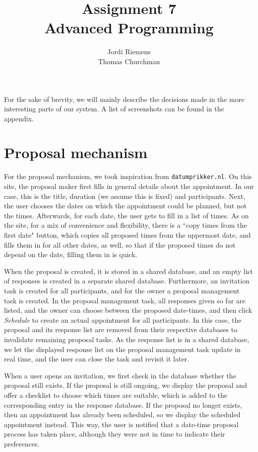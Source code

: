 \documentclass{article}
\title{Assignment 7\\\normalsize{Advanced Programming}}
\author{Jordi Riemens\\Thomas Churchman}
\begin{document}
	\maketitle
	
    For the sake of brevity, we will mainly describe the decisions made in the more interesting parts of our system.
    A list of screenshots can be found in the appendix.
    
	\section{Proposal mechanism}
    For the proposal mechanism, we took inspiration from \texttt{datumprikker.nl}.
    On this site, the proposal maker first fills in general details about the appointment. In our case, this is the title, duration (we assume this is fixed) and participants.
    Next, the user chooses the dates on which the appointment could be planned, but not the times. Afterwards, for each date, the user gets to fill in a list of times.
    As on the site, for a mix of convenience and flexibility, there is a ``copy times from the first date" button, which copies all proposed times from the uppermost date,
    and fills them in for all other dates, as well, so that if the proposed times do not depend on the date, filling them in is quick.
    
    When the proposal is created, it is stored in a shared database, and an empty list of responses is created in a separate shared database.
    Furthermore, an invitation task is created for all participants, and for the owner a proposal management task is created.
    In the proposal management task, all responses given so far are listed, and the owner can choose between the proposed date-times, and then click \emph{Schedule} to create an actual appointment for all participants.
    In this case, the proposal and its response list are removed from their respective databases to invalidate remaining proposal tasks.
    As the response list is in a shared database, we let the displayed response list on the proposal management task update in real time, and the user can close the task and revisit it later.
    
    When a user opens an invitation, we first check in the database whether the proposal still exists.
    If the proposal is still ongoing, we display the proposal and offer a checklist to choose which times are suitable, which is added to the corresponding entry in the response database.
    If the proposal no longer exists, then an appointment has already been scheduled, so we display the scheduled appointment instead.
    This way, the user is notified that a date-time proposal process has taken place, although they were not in time to indicate their preferences.
    
\end{document}
